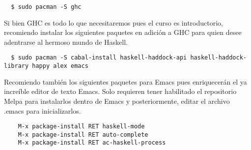 \documentclass[11pt, letter-paper]{article}
\begin{document}
\begin{lstlisting}
  $ sudo pacman -S ghc
\end{lstlisting}

Si bien GHC es todo lo que necesitaremos pues el curso es introductorio, recomiendo instalar los siguientes paquetes en adición a GHC para quien desee adentrarse al hermoso mundo de Haskell.

\begin{lstlisting}
  $ sudo pacman -S cabal-install haskell-haddock-api haskell-haddock-library happy alex emacs 
\end{lstlisting}

Recomiendo también los siguientes paquetes para Emacs pues enriquecerán el ya increíble editor de texto Emacs. Solo requieren tener habilitado el repositorio Melpa para instalarlos dentro de Emacs y posteriormente, editar el archivo .emacs para inicializarlos.

\begin{lstlisting}
    M-x package-install RET haskell-mode
    M-x package-install RET auto-complete
    M-x package-install RET ac-haskell-process
\end{lstlisting}
\end{document}
